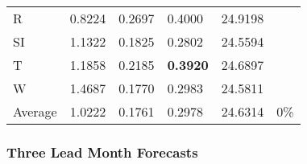 \documentclass[11pt, a4paper]{article}
\begin{document}
\begin{table}[H]
\begin{tabular}{llllll}
R                                & 0.8224                            & 0.2697                            & 0.4000                               & 24.9198                                     &                                   \\
SI                        & 1.1322                            & 0.1825                            & 0.2802                               & 24.5594                                     &                                   \\
T                              & 1.1858                            & 0.2185                            & \textbf{0.3920}                      & 24.6897                                     &                                   \\
W                             & 1.4687                            & 0.1770                            & 0.2983                               & 24.5811                                     &                                   \\ \hline
Average                               & 1.0222                            & 0.1761                            & 0.2978                               & 24.6314                                     & 0\%
\end{tabular}
\end{table}

\subsubsection{Three Lead Month Forecasts}\label{apd:three}
\end{document}
